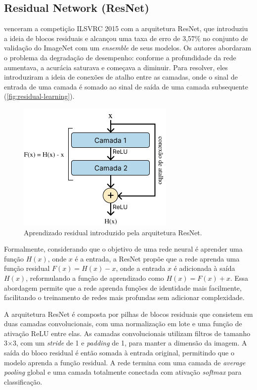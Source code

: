 \subsection{Residual Network (ResNet)}

 venceram a competição ILSVRC 2015 com a arquitetura ResNet, que introduziu a ideia de blocos residuais e alcançou uma taxa de erro de 3,57\% no conjunto de validação do ImageNet com um \textit{ensemble} de seus modelos. Os autores abordaram o problema da degradação de desempenho: conforme a profundidade da rede aumentava, a acurácia saturava e começava a diminuir. Para resolver, eles introduziram a ideia de conexões de atalho entre as camadas, onde o sinal de entrada de uma camada é somado ao sinal de saída de uma camada subsequente (\autoref{fig:residual-learning}).

\begin{figure}[!htbp]
    \centering
    \includegraphics[width=0.5\linewidth]{figs/residual-connection.png}
    \caption{Aprendizado residual introduzido pela arquitetura ResNet.}
    \label{fig:residual-learning}
\end{figure}

Formalmente, considerando que o objetivo de uma rede neural é aprender uma função \( H(x) \), onde \( x \) é a entrada, a ResNet propõe que a rede aprenda uma função residual \( F(x) = H(x) - x \), onde a entrada \( x \) é adicionada à saída \( H(x) \), reformulando a função de aprendizado como \( H(x) = F(x) + x \). Essa abordagem permite que a rede aprenda funções de identidade mais facilmente, facilitando o treinamento de redes mais profundas sem adicionar complexidade.

A arquitetura ResNet é composta por pilhas de blocos residuais que consistem em duas camadas convolucionais, com uma normalização em lote e uma função de ativação ReLU entre elas. As camadas convolucionais utilizam filtros de tamanho 3×3, com um \textit{stride} de 1 e \textit{padding} de 1, para manter a dimensão da imagem. A saída do bloco residual é então somada à entrada original, permitindo que o modelo aprenda a função residual. A rede termina com uma camada de \textit{average pooling} global e uma camada totalmente conectada com ativação \textit{softmax} para classificação.

